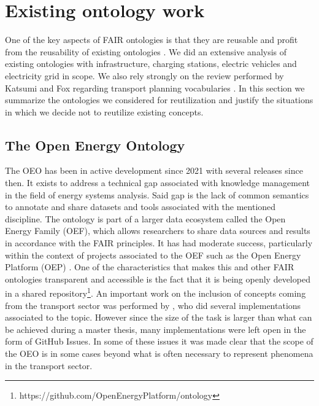 
\section{Existing ontology work}
\label{existingontologies}

One of the key aspects of FAIR ontologies is that they are reusable and profit
from the reusability of existing ontologies \cite{PovedaVillalon.2020}. We did
an extensive analysis of existing ontologies with infrastructure, charging
stations, electric vehicles and electricity grid in scope. We also rely
strongly on the review performed by Katsumi and Fox regarding transport
planning vocabularies \cite{Katsumi.2018}. In this section we summarize the
ontologies we considered for reutilization and justify the situations in which
we decide not to reutilize existing concepts.


\subsection{The Open Energy Ontology}

The OEO has been in active development since 2021 with several releases since
then. It exists to address a technical gap associated with knowledge management
in the field of energy systems analysis. Said gap is the lack of common
semantics to annotate and share datasets and tools associated with the
mentioned discipline. The ontology is part of a larger data ecosystem called
the Open Energy Family (OEF), which allows researchers to share data sources
and results in accordance with the FAIR principles. It has had moderate
success, particularly within the context of projects associated to the OEF such
as the Open Energy Platform (OEP) \cite{Hulk.2024}. One of the characteristics
that makes this and other FAIR ontologies transparent and accessible is the
fact that it is being openly developed in a shared
repository\footnote{https://github.com/OpenEnergyPlatform/ontology}. An
important work on the inclusion of concepts coming from the transport sector
was performed by \cite{Mittermeier.2023}, who did several implementations
associated to the topic. However since the size of the task is larger than what
can be achieved during a master thesis, many implementations were left open in
the form of GitHub Issues. In some of these issues it was made clear that the
scope of the OEO is in some cases beyond what is often necessary to represent
phenomena in the transport sector.


